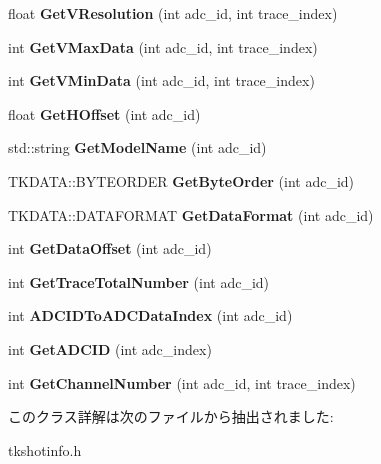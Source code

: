 \begin{DoxyCompactItemize}
float {\bfseries Get\+V\+Resolution} (int adc\+\_\+id, int trace\+\_\+index)
\item 
\mbox{\label{class_t_k_s_h_o_t_aa69c94f494055fd98ff3982681d6795c}} 
int {\bfseries Get\+V\+Max\+Data} (int adc\+\_\+id, int trace\+\_\+index)
\item 
\mbox{\label{class_t_k_s_h_o_t_ab02def889d5bf8c6103dbac2a5f89ab6}} 
int {\bfseries Get\+V\+Min\+Data} (int adc\+\_\+id, int trace\+\_\+index)
\item 
\mbox{\label{class_t_k_s_h_o_t_ae9bd114c4904e0f20929988b4307587f}} 
float {\bfseries Get\+H\+Offset} (int adc\+\_\+id)
\item 
\mbox{\label{class_t_k_s_h_o_t_adb4af221e08781c6f742ff681d134163}} 
std\+::string {\bfseries Get\+Model\+Name} (int adc\+\_\+id)
\item 
\mbox{\label{class_t_k_s_h_o_t_acfcfbf59a93120c97de2eee6acec5104}} 
T\+K\+D\+A\+T\+A\+::\+B\+Y\+T\+E\+O\+R\+D\+ER {\bfseries Get\+Byte\+Order} (int adc\+\_\+id)
\item 
\mbox{\label{class_t_k_s_h_o_t_a30ef4f11ad37a0e1ab3002d6e7a335d6}} 
T\+K\+D\+A\+T\+A\+::\+D\+A\+T\+A\+F\+O\+R\+M\+AT {\bfseries Get\+Data\+Format} (int adc\+\_\+id)
\item 
\mbox{\label{class_t_k_s_h_o_t_ace4770ac6dcdec71ce95823689a58380}} 
int {\bfseries Get\+Data\+Offset} (int adc\+\_\+id)
\item 
\mbox{\label{class_t_k_s_h_o_t_a45a19a71b5d82762601acef738ad504d}} 
int {\bfseries Get\+Trace\+Total\+Number} (int adc\+\_\+id)
\item 
\mbox{\label{class_t_k_s_h_o_t_a370000c7133ee68afe584d7c74864411}} 
int {\bfseries A\+D\+C\+I\+D\+To\+A\+D\+C\+Data\+Index} (int adc\+\_\+id)
\item 
\mbox{\label{class_t_k_s_h_o_t_a5402cb531f82fe70ba46a4f0d97dfedf}} 
int {\bfseries Get\+A\+D\+C\+ID} (int adc\+\_\+index)
\item 
\mbox{\label{class_t_k_s_h_o_t_a71522d246c17a4643838a01bef2943ff}} 
int {\bfseries Get\+Channel\+Number} (int adc\+\_\+id, int trace\+\_\+index)
\end{DoxyCompactItemize}


このクラス詳解は次のファイルから抽出されました\+:\begin{DoxyCompactItemize}
\item 
tkshotinfo.\+h\end{DoxyCompactItemize}
